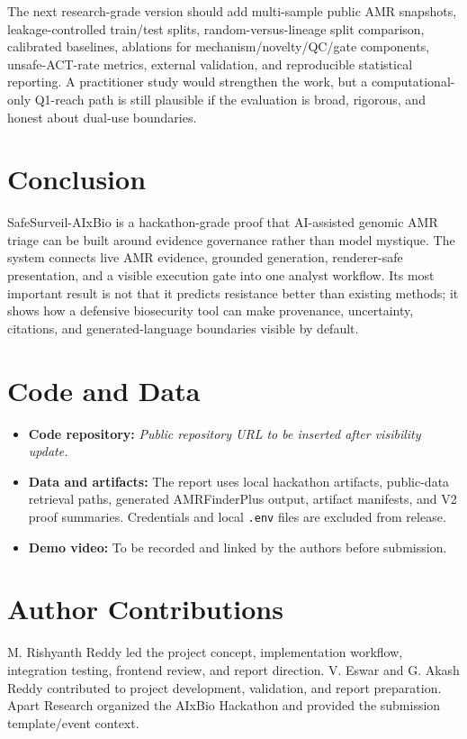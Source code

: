 \documentclass[11pt, letterpaper]{article}
\newcommand{\project}{SafeSurveil-AIxBio}
\newcommand{\codepending}{\textit{Public repository URL to be inserted after visibility update.}}
\begin{document}
The next research-grade version should add multi-sample public AMR snapshots, leakage-controlled train/test splits, random-versus-lineage split comparison, calibrated baselines, ablations for mechanism/novelty/QC/gate components, unsafe-ACT-rate metrics, external validation, and reproducible statistical reporting. A practitioner study would strengthen the work, but a computational-only Q1-reach path is still plausible if the evaluation is broad, rigorous, and honest about dual-use boundaries.

\section{Conclusion}

\project{} is a hackathon-grade proof that AI-assisted genomic AMR triage can be built around evidence governance rather than model mystique. The system connects live AMR evidence, grounded generation, renderer-safe presentation, and a visible execution gate into one analyst workflow. Its most important result is not that it predicts resistance better than existing methods; it shows how a defensive biosecurity tool can make provenance, uncertainty, citations, and generated-language boundaries visible by default.

\section*{Code and Data}

\begin{itemize}[label=-]
    \item \textbf{Code repository:} \codepending
    \item \textbf{Data and artifacts:} The report uses local hackathon artifacts, public-data retrieval paths, generated AMRFinderPlus output, artifact manifests, and V2 proof summaries. Credentials and local \texttt{.env} files are excluded from release.
    \item \textbf{Demo video:} To be recorded and linked by the authors before submission.
\end{itemize}

\section*{Author Contributions}

M. Rishyanth Reddy led the project concept, implementation workflow, integration testing, frontend review, and report direction. V. Eswar and G. Akash Reddy contributed to project development, validation, and report preparation. Apart Research organized the AIxBio Hackathon and provided the submission template/event context.
\end{document}
